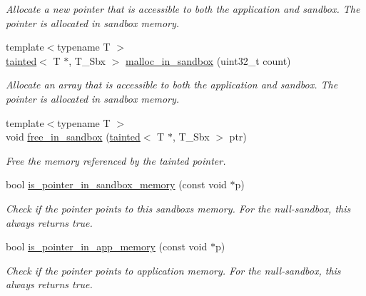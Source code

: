 \begin{DoxyCompactItemize}
\begin{DoxyCompactList}\small\item\em Allocate a new pointer that is accessible to both the application and sandbox. The pointer is allocated in sandbox memory. \end{DoxyCompactList}\item 
{\footnotesize template$<$typename T $>$ }\\\hyperlink{classrlbox_1_1tainted}{tainted}$<$ T $\ast$, T\+\_\+\+Sbx $>$ \hyperlink{classrlbox_1_1rlbox__sandbox_a967ee4efa3c49a4493eaeda65b338e70}{malloc\+\_\+in\+\_\+sandbox} (uint32\+\_\+t count)
\begin{DoxyCompactList}\small\item\em Allocate an array that is accessible to both the application and sandbox. The pointer is allocated in sandbox memory. \end{DoxyCompactList}\item 
{\footnotesize template$<$typename T $>$ }\\void \hyperlink{classrlbox_1_1rlbox__sandbox_a775b1828f996dc8f14f24a296096e0e3}{free\+\_\+in\+\_\+sandbox} (\hyperlink{classrlbox_1_1tainted}{tainted}$<$ T $\ast$, T\+\_\+\+Sbx $>$ ptr)
\begin{DoxyCompactList}\small\item\em Free the memory referenced by the tainted pointer. \end{DoxyCompactList}\item 
\mbox{\label{classrlbox_1_1rlbox__sandbox_a55e48f0300c16d36ea7ed5a7e4750f64}} 
bool \hyperlink{classrlbox_1_1rlbox__sandbox_a55e48f0300c16d36ea7ed5a7e4750f64}{is\+\_\+pointer\+\_\+in\+\_\+sandbox\+\_\+memory} (const void $\ast$p)
\begin{DoxyCompactList}\small\item\em Check if the pointer points to this sandbox\textquotesingle{}s memory. For the null-\/sandbox, this always returns true. \end{DoxyCompactList}\item 
\mbox{\label{classrlbox_1_1rlbox__sandbox_afc6c3f229b2807517c54cc120dfda941}} 
bool \hyperlink{classrlbox_1_1rlbox__sandbox_afc6c3f229b2807517c54cc120dfda941}{is\+\_\+pointer\+\_\+in\+\_\+app\+\_\+memory} (const void $\ast$p)
\begin{DoxyCompactList}\small\item\em Check if the pointer points to application memory. For the null-\/sandbox, this always returns true. \end{DoxyCompactList}\item 

\end{DoxyCompactItemize}
